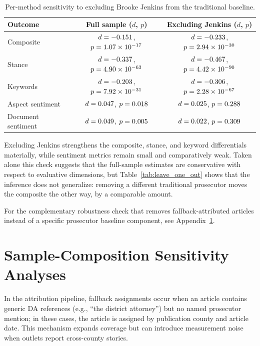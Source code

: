 \documentclass[12pt, letterpaper]{article}
\begin{document}
\begin{appendices}
\begin{table}[H]
\centering
\caption{Per-method sensitivity to excluding Brooke Jenkins from the traditional baseline.}
\label{tab:baseline_sensitivity}
\begin{tabular}{lcc}
\toprule
Outcome & Full sample ($d$, $p$) & Excluding Jenkins ($d$, $p$) \\
\midrule
Composite & $d=-0.151$, $p=1.07\times 10^{-17}$ & $d=-0.233$, $p=2.94\times 10^{-30}$ \\
Stance & $d=-0.337$, $p=4.90\times 10^{-63}$ & $d=-0.467$, $p=4.42\times 10^{-90}$ \\
Keywords & $d=-0.203$, $p=7.92\times 10^{-31}$ & $d=-0.306$, $p=2.28\times 10^{-67}$ \\
Aspect sentiment & $d=0.047$, $p=0.018$ & $d=0.025$, $p=0.288$ \\
Document sentiment & $d=0.049$, $p=0.005$ & $d=0.022$, $p=0.309$ \\
\bottomrule
\end{tabular}
\end{table}

Excluding Jenkins strengthens the composite, stance, and keyword differentials materially, while sentiment metrics remain small and comparatively weak. Taken alone this check suggests that the full-sample estimates are conservative with respect to evaluative dimensions, but Table~\ref{tab:leave_one_out} shows that the inference does not generalize: removing a different traditional prosecutor moves the composite the other way, by a comparable amount.

For the complementary robustness check that removes fallback-attributed articles instead of a specific prosecutor baseline component, see Appendix~\ref{app:fallback_sensitivity}.

\section{Sample-Composition Sensitivity Analyses}
\label{app:fallback_sensitivity}

In the attribution pipeline, fallback assignments occur when an article contains generic DA references (e.g., ``the district attorney'') but no named prosecutor mention; in these cases, the article is assigned by publication county and article date. This mechanism expands coverage but can introduce measurement noise when outlets report cross-county stories.


\end{appendices}
\end{document}
